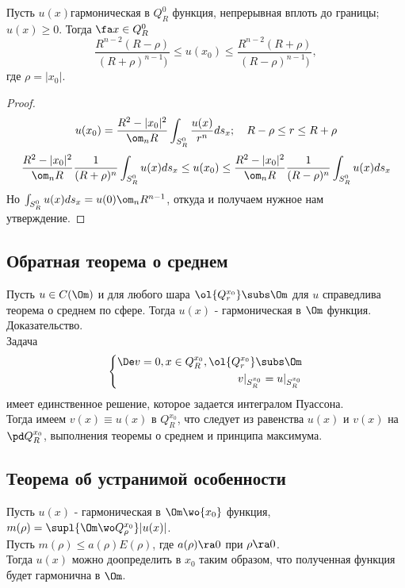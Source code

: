 \documentclass[a4paper,draft]{article}
\begin{document}
\begin{theorem}
Пусть $u(x)$\т гармоническая в $Q^0_R$ функция, непрерывная вплоть
до границы; $u(x)\ge 0$. Тогда $\fa x\in Q^0_R$
$$
\frac{R^{n-2}(R-\rho)}{(R+\rho)^{n-1})}\le u(x_0)\le
\frac{R^{n-2}(R+\rho)}{(R-\rho)^{n-1})},
$$
где $\rho=|x_0|$.
\end{theorem}
\begin{proof}
$$
u(x_0)=\frac{R^2-|x_0|^2}{\om_nR}\int_{S_R^0}\frac{u(x)}{r^n}ds_x;\quad
R-\rho\le r\le R+\rho
$$
$$
\frac{R^2-|x_0|^2}{\om_nR}\frac{1}{(R+\rho)^n}\int_{S_R^0}u(x)ds_x\le
u(x_0)\le\frac{R^2-|x_0|^2}{\om_nR}\frac{1}{(R-\rho)^n}\int_{S_R^0}u(x)ds_x
$$
Но $\int_{S_R^0}u(x)ds_x=u(0)\om_nR^{n-1}$, откуда и получаем
нужное нам
утверждение.
\end{proof}

\subsection{Обратная теорема о среднем}
Пусть $u\in C(\Om)$ и для любого шара
$\ol{Q_r^{x_0}}\subs\Om$ для $u$ справедлива теорема о
среднем по сфере. Тогда $u(x)$ - гармоническая в $\Om$
функция.\\
Доказательство.\\
Задача
$$
\left\{
\begin{aligned}
\De v=0, x\in  Q_R^{x_0},\ol{Q_r^{x_0}}\subs\Om\\
v|_{S^{x_0}_R}=u|_{S^{x_0}_R}\\
\end{aligned}
\right.
$$
имеет единственное решение, которое задается интегралом
Пуассона.\\
Тогда имеем $v(x)\equiv u(x)$ в $Q_R^{x_0}$, что следует из
равенства $u(x)$ и $v(x)$ на $\pd Q_R^{x_0}$, выполнения
теоремы о среднем и принципа максимума.
\subsection{Теорема об устранимой особенности}
Пусть $u(x)$ - гармоническая в $\Om\wo\{x_0\}$ функция,
$m(\rho)=\supl{\Om\wo Q_{\rho}^{x_0}}|u(x)|$.\\
Пусть $m(\rho)\le a(\rho)E(\rho)$, где $a(\rho)\ra 0$ при
$\rho\ra 0$.\\
Тогда $u(x)$ можно доопределить в $x_0$ таким образом, что
полученная функция будет гармонична в $\Om$.
\end{document}

